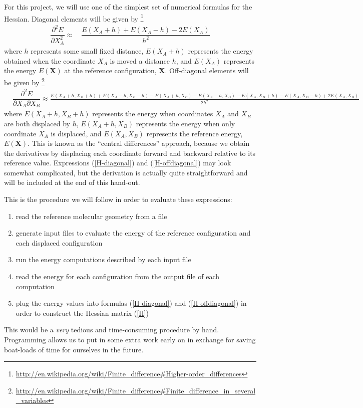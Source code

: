 \documentclass[11pt]{article}
\newcommand{\bo}[1]{\ensuremath{\mathbf{#1}}}
\newcommand{\pt}{\partial}
\newcommand{\fr}[2]{\dfrac{#1}{#2}}
\begin{document}
For this project, we will use one of the simplest set of numerical formulas for the Hessian.
Diagonal elements will be given by \footnote{\url{http://en.wikipedia.org/wiki/Finite_difference\#Higher-order_differences}}
\begin{align}
	\fr{\pt^2 E}{\pt X_A^2} \approx&\
	\fr{E(X_A+h)+E(X_A-h)-2E(X_A)}{h^2}
	\label{H-diagonal}
\end{align}
where $h$ represents some small fixed distance, $E(X_A+h)$ represents the energy obtained when the coordinate $X_A$ is moved a distance $h$, and $E(X_A)$ represents the energy $E(\bo{X})$ at the reference configuration, $\bo{X}$.
Off-diagonal elements will be given by \footnote{\url{http://en.wikipedia.org/wiki/Finite_difference\#Finite_difference_in_several_variables}}
\begin{align}
&
	\fr{\pt^2 E}{\pt X_A\pt X_B} \approx
	\tfrac{E(X_A+h,X_B+h)+E(X_A-h,X_B-h)
		-E(X_A+h,X_B)-E(X_A-h,X_B)
		-E(X_A,X_B+h)-E(X_A,X_B-h)+2E(X_A,X_B)}{2h^2}
	\label{H-offdiagonal}
\end{align}
where $E(X_A+h,X_B+h)$ represents the energy when coordinates $X_A$ and $X_B$ are both displaced by $h$, $E(X_A+h,X_B)$ represents the energy when only coordinate $X_A$ is displaced, and $E(X_A,X_B)$ represents the reference energy, $E(\bo{X})$.
This is known as the ``central differences'' approach, because we obtain the derivatives by displacing each coordinate forward and backward relative to its reference value.
Expressions (\ref{H-diagonal}) and (\ref{H-offdiagonal}) may look somewhat complicated, but the derivation is actually quite straightforward and will be included at the end of this hand-out.

This is the procedure we will follow in order to evaluate these expressions:
\begin{enumerate}
	\item read the reference molecular geometry from a file
	\item generate input files to evaluate the energy of the reference configuration and each displaced configuration
	\item run the energy computations described by each input file
	\item read the energy for each configuration from the output file of each computation
	\item plug the energy values into formulas (\ref{H-diagonal}) and (\ref{H-offdiagonal}) in order to construct the Hessian matrix (\ref{H})
\end{enumerate}
This would be a {\it very} tedious and time-consuming procedure by hand.
Programming allows us to put in some extra work early on in exchange for saving boat-loads of time for ourselves in the future.
\end{document}
